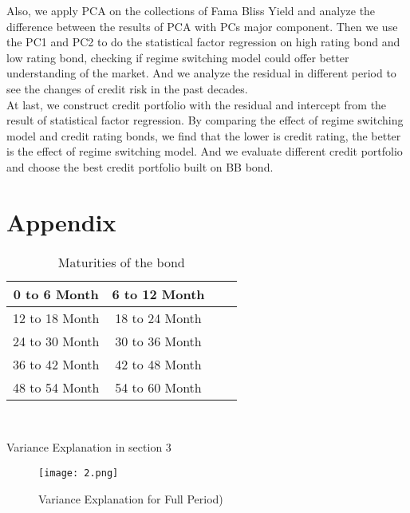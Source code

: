 \documentclass[12pt]{article}
\begin{document}
Also, we apply PCA on the collections of Fama Bliss Yield and analyze the difference between the results of PCA with PCs major component. Then we use the PC1 and PC2 to do the statistical factor regression on high rating bond and low rating bond, checking if regime switching model could offer better understanding of the market. And we analyze the residual in different period to see the changes of credit risk in the past decades.\\

At last, we construct credit portfolio with the residual and intercept from the result of statistical factor regression. By comparing the effect of regime switching model and credit rating bonds, we find that the lower is credit rating, the better is the effect of regime switching model. And we evaluate different credit portfolio and choose the best credit portfolio built on BB bond.





\pagestyle{fancyplain}
\cfoot{}

\section{Appendix}

\begin {table}[H]
\caption {Maturities of the bond} \label{tab:title} 
\begin{center}
\begin{tabular} {|c|c|c|c|}
\hline
0 to 6 Month &  6 to 12 Month \\
\hline
12 to 18 Month & 18 to 24 Month\\
\hline
24 to 30 Month & 30 to 36 Month\\
\hline 
36 to 42 Month & 42 to 48 Month\\
\hline
48 to 54 Month & 54 to 60 Month\\
\hline
\end{tabular}\\
\end{center}
\end {table}

Variance Explanation in section 3

\begin{figure}[H]
\centering
\texttt{[image: 2.png]}\\
\caption{Variance Explanation for Full Period)}
\end{figure}
\end{document}
